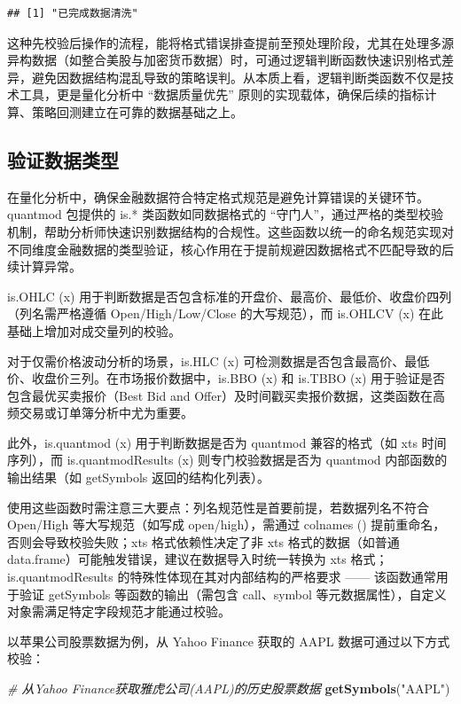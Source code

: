 \documentclass[]{ctexbook}
\newenvironment{Shaded}{\begin{snugshade}}{\end{snugshade}}
\newcommand{\CommentTok}[1]{\textcolor[rgb]{0.56,0.35,0.01}{\textit{#1}}}
\newcommand{\FunctionTok}[1]{\textcolor[rgb]{0.13,0.29,0.53}{\textbf{#1}}}
\newcommand{\NormalTok}[1]{#1}
\newcommand{\StringTok}[1]{\textcolor[rgb]{0.31,0.60,0.02}{#1}}
\begin{document}
\begin{verbatim}
## [1] "已完成数据清洗"
\end{verbatim}

这种先校验后操作的流程，能将格式错误排查提前至预处理阶段，尤其在处理多源异构数据（如整合美股与加密货币数据）时，可通过逻辑判断函数快速识别格式差异，避免因数据结构混乱导致的策略误判。从本质上看，逻辑判断类函数不仅是技术工具，更是量化分析中 ``数据质量优先'' 原则的实现载体，确保后续的指标计算、策略回测建立在可靠的数据基础之上。

\subsection{验证数据类型}\label{ux9a8cux8bc1ux6570ux636eux7c7bux578b}

在量化分析中，确保金融数据符合特定格式规范是避免计算错误的关键环节。quantmod 包提供的 is.* 类函数如同数据格式的 ``守门人''，通过严格的类型校验机制，帮助分析师快速识别数据结构的合规性。这些函数以统一的命名规范实现对不同维度金融数据的类型验证，核心作用在于提前规避因数据格式不匹配导致的后续计算异常。

is.OHLC (x) 用于判断数据是否包含标准的开盘价、最高价、最低价、收盘价四列（列名需严格遵循 Open/High/Low/Close 的大写规范），而 is.OHLCV (x) 在此基础上增加对成交量列的校验。

对于仅需价格波动分析的场景，is.HLC (x) 可检测数据是否包含最高价、最低价、收盘价三列。在市场报价数据中，is.BBO (x) 和 is.TBBO (x) 用于验证是否包含最优买卖报价（Best Bid and Offer）及时间戳买卖报价数据，这类函数在高频交易或订单簿分析中尤为重要。

此外，is.quantmod (x) 用于判断数据是否为 quantmod 兼容的格式（如 xts 时间序列），而 is.quantmodResults (x) 则专门校验数据是否为 quantmod 内部函数的输出结果（如 getSymbols 返回的结构化列表）。

使用这些函数时需注意三大要点：列名规范性是首要前提，若数据列名不符合 Open/High 等大写规范（如写成 open/high），需通过 colnames () 提前重命名，否则会导致校验失败；xts 格式依赖性决定了非 xts 格式的数据（如普通 data.frame）可能触发错误，建议在数据导入时统一转换为 xts 格式；is.quantmodResults 的特殊性体现在其对内部结构的严格要求 ------ 该函数通常用于验证 getSymbols 等函数的输出（需包含 call、symbol 等元数据属性），自定义对象需满足特定字段规范才能通过校验。

以苹果公司股票数据为例，从 Yahoo Finance 获取的 AAPL 数据可通过以下方式校验：

\begin{Shaded}
\begin{Highlighting}[]
\CommentTok{\# 从Yahoo Finance获取雅虎公司(AAPL)的历史股票数据}
\FunctionTok{getSymbols}\NormalTok{(}\StringTok{"AAPL"}\NormalTok{)}
\end{Highlighting}
\end{Shaded}
\end{document}
